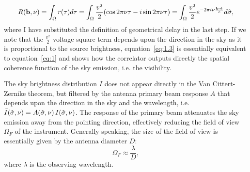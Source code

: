 \begin{equation}
R ({\bf b}, \nu) = \int_\Omega r(\tau) d\tau = \int_\Omega \frac{v^2}{2} (\cos{2\pi \nu \tau} - i\sin{2\pi \nu \tau}) = \int_\Omega \frac{v^2}{2} e^{-2 \pi i \nu \frac{{\bf b} \cdot {\hat {\bf \sigma}}}{c}} d \hat{\bf \sigma},
\label{eq:1.3}
\end{equation}
where I have substituted the definition of geometrical delay in the last step. If we note that the $\frac{v^2}{2}$ voltage square term depends upon the direction in the sky as it is proportional to the source brightness, equation~\ref{eq:1.3} is essentially equivalent to equation~\ref{eq:1} and shows how the correlator outputs directly the spatial coherence function of the sky emission, i.e. the visibility.  

The sky brightness distribution $I$ does not appear directly in the Van Cittert-Zernike theorem, but filtered by the antenna primary beam response $A$ that depends upon the direction in the sky and the wavelength, i.e. ${\bar I} (\hat{\bf \sigma}, \nu) = A (\hat{\bf \sigma}, \nu)  \, I (\hat{\bf \sigma}, \nu)$. The response of the primary beam attenuates the sky emission away from the pointing direction, effectively reducing the field of view $\Omega_F$ of the instrument. Generally speaking, the size of the field of view is essentially given by the antenna diameter $D$: 
\begin{equation}
\Omega_F \approx \frac{\lambda}{D},
\label{eq:2}
\end{equation}
where $\lambda$ is the observing wavelength.


